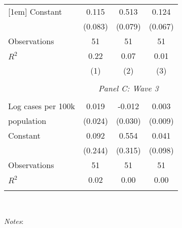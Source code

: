 \begin{table}[!htbp]
\begin{tabular}{@{\extracolsep{5pt}}lccc}
[1em]
Constant            &       0.115         &       0.513\sym{***}&       0.124\sym{*}  \\
                    &     (0.083)         &     (0.079)         &     (0.067)         \\
[1em]
Observations        &          51         &          51         &          51         \\
\(R^{2}\)           &        0.22         &        0.07         &        0.01         \\
                    &\multicolumn{1}{c}{(1)}         &\multicolumn{1}{c}{(2)}         &\multicolumn{1}{c}{(3)}         \\
\hline \\               & \multicolumn{3}{c}{\textit{Panel C: Wave 3}} \\               \addlinespace[1mm] \\
Log cases per 100k  &       0.019         &      -0.012         &       0.003         \\
population          &     (0.024)         &     (0.030)         &     (0.009)         \\
[1em]
Constant            &       0.092         &       0.554\sym{*}  &       0.041         \\
                    &     (0.244)         &     (0.315)         &     (0.098)         \\
[1em]
Observations        &          51         &          51         &          51         \\
\(R^{2}\)           &        0.02         &        0.00         &        0.00         \\
\hline                         \hline                          \hline \\[-1.8ex]                          \end{tabular}                         \\                         \begin{minipage}{1.0 \textwidth}                         {\footnotesize \emph{Notes}:                          \starlanguage}                         \end{minipage}                         \end{table}
